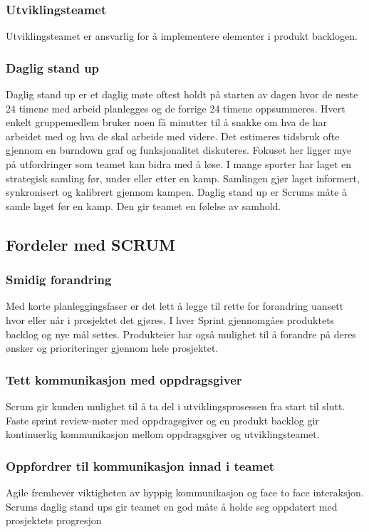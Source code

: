 \subsubsection{\textbf{Utviklingsteamet}}
Utviklingsteamet er ansvarlig for å implementere elementer i produkt backlogen.

\subsubsection{\textbf{Daglig stand up}}
Daglig stand up er et daglig møte oftest holdt på starten av dagen hvor de neste 24 timene med arbeid planlegges og de forrige 24 timene oppsummeres. Hvert enkelt gruppemedlem bruker noen få minutter til å snakke om hva de har arbeidet med og hva de skal arbeide med videre. Det estimeres tidsbruk ofte gjennom en burndown graf og funksjonalitet diskuteres. Fokuset her ligger mye på utfordringer som teamet kan bidra med å løse. I mange sporter har laget en strategisk samling før, under eller etter en kamp. Samlingen gjør laget informert, synkronisert og kalibrert gjennom kampen. Daglig stand up er Scrums måte å samle laget før en kamp. Den gir teamet en følelse av samhold.

\subsection{\textbf{Fordeler med SCRUM}}

\subsubsection{\textbf{Smidig forandring}}
Med korte planleggingsfaser er det lett å legge til rette for forandring uansett hvor eller når i prosjektet det gjøres. I hver Sprint gjennomgåes produktets backlog og nye mål settes. Produkteier har også mulighet til å forandre på deres ønsker og prioriteringer gjennom hele prosjektet. 

\subsubsection{\textbf{Tett kommunikasjon med oppdragsgiver}}
Scrum gir kunden mulighet til å ta del i utviklingsprosessen fra start til slutt. Faste sprint review-møter med oppdragsgiver og en produkt backlog gir kontinuerlig kommunikasjon mellom oppdragsgiver og utviklingsteamet. 

\subsubsection{\textbf{Oppfordrer til kommunikasjon innad i teamet}}
Agile fremhever viktigheten av hyppig kommunikasjon og face to face interaksjon. Scrums daglig stand ups gir teamet en god måte å holde seg oppdatert med prosjektets progresjon


